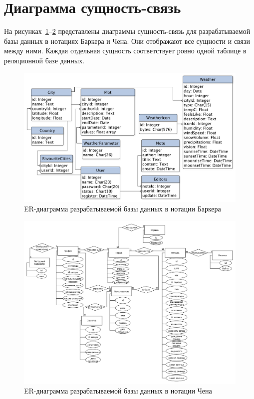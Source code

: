 \section{Диаграмма сущность-связь}
На рисунках~\ref{fig:er-barker}--\ref{fig:er-chen} представлены диаграммы сущность-связь для разрабатываемой базы данных в нотациях Баркера и Чена.
Они отображают все сущности и связи между ними.
Каждая отдельная сущность соответствует ровно одной таблице в реляционной базе данных.
\begin{figure}[H]
	\centering
	\includegraphics[height=0.45\textheight, width=\textwidth]{tools/img/er-barker.pdf}
	\caption{
        ER-диаграмма разрабатываемой базы данных в нотации Баркера
    }
	\label{fig:er-barker}
\end{figure}

\begin{figure}[H]
	\centering
	\includegraphics[height=0.6\textheight, width=\textwidth]{tools/img/er-chen.pdf}
	\caption{
        ER-диаграмма разрабатываемой базы данных в нотации Чена
    }
	\label{fig:er-chen}
\end{figure}

